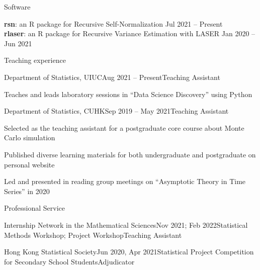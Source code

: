 \documentclass[10pt]{resume} %
\begin{document}

\begin{rSection}{Software}

\textbf{rsn}: an R package for Recursive Self-Normalization \hfill {Jul 2021 -- Present} \\
\textbf{rlaser}: an R package for Recursive Variance Estimation with LASER \hfill {Jan 2020 -- Jun 2021}

\end{rSection}


\begin{rSection}{Teaching experience}

\begin{rSubsection}{Department of Statistics, UIUC}{Aug 2021 -- Present}{Teaching Assistant}{}
\item Teaches and leads laboratory sessions in ``Data Science Discovery'' using Python
\end{rSubsection}

\begin{rSubsection}{Department of Statistics, CUHK}{Sep 2019 -- May 2021}{Teaching Assistant}{}
\item Selected as the teaching assistant for a postgraduate core course about Monte Carlo simulation
\item Published diverse learning materials for both undergraduate and postgraduate on personal website
\item Led and presented in reading group meetings on ``Asymptotic Theory in Time Series'' in 2020
\end{rSubsection}

\end{rSection}


\begin{rSection}{Professional Service}

\begin{rSecitem}{Internship Network in the Mathematical Sciences}{Nov 2021; Feb 2022}{Statistical Methods Workshop; Project Workshop}{Teaching Assistant}
\end{rSecitem}

\begin{rSecitem}{Hong Kong Statistical Society}{Jun 2020, Apr 2021}{Statistical Project Competition for Secondary School Students}{Adjudicator}
\end{rSecitem}

\end{rSection}
\end{document}
